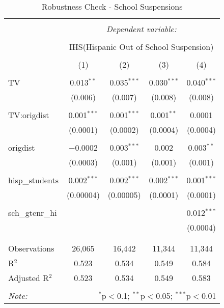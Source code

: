 
\begin{table}[!htbp] \centering 
  \caption{Robustness Check - School Suspensions} 
  \label{} 
\begin{tabular}{@{\extracolsep{-2pt}}lcccc} 
\\[-1.8ex]\hline 
\hline \\[-1.8ex] 
 & \multicolumn{4}{c}{\textit{Dependent variable:}} \\ 
\cline{2-5} 
\\[-1.8ex] & \multicolumn{4}{c}{IHS(Hispanic Out of School Suspension)} \\ 
\\[-1.8ex] & (1) & (2) & (3) & (4)\\ 
\hline \\[-1.8ex] 
 TV & 0.013$^{**}$ & 0.035$^{***}$ & 0.030$^{***}$ & 0.040$^{***}$ \\ 
  & (0.006) & (0.007) & (0.008) & (0.008) \\ 
  & & & & \\ 
 TV:origdist & 0.001$^{***}$ & 0.001$^{***}$ & 0.001$^{**}$ & 0.0001 \\ 
  & (0.0001) & (0.0002) & (0.0004) & (0.0004) \\ 
  & & & & \\ 
 origdist & $-$0.0002 & 0.003$^{***}$ & 0.002 & 0.003$^{**}$ \\ 
  & (0.0003) & (0.001) & (0.001) & (0.001) \\ 
  & & & & \\ 
 hisp\_students & 0.002$^{***}$ & 0.002$^{***}$ & 0.002$^{***}$ & 0.001$^{***}$ \\ 
  & (0.00004) & (0.00005) & (0.0001) & (0.0001) \\ 
  & & & & \\ 
 sch\_gtenr\_hi &  &  &  & 0.012$^{***}$ \\ 
  &  &  &  & (0.0004) \\ 
  & & & & \\ 
\hline \\[-1.8ex] 
Observations & 26,065 & 16,442 & 11,344 & 11,344 \\ 
R$^{2}$ & 0.523 & 0.534 & 0.549 & 0.584 \\ 
Adjusted R$^{2}$ & 0.523 & 0.534 & 0.549 & 0.583 \\ 
\hline 
\hline \\[-1.8ex] 
\textit{Note:}  & \multicolumn{4}{r}{$^{*}$p$<$0.1; $^{**}$p$<$0.05; $^{***}$p$<$0.01} \\ 
\end{tabular} 
\end{table} 
